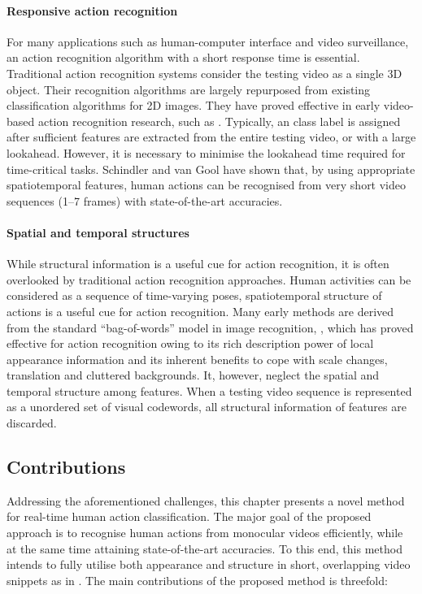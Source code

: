 \paragraph{Responsive action recognition}  
For many applications such as human-computer interface and video surveillance, an action recognition algorithm with a short response time is essential.  
Traditional action recognition systems consider the testing video as a single 3D object. 
Their recognition algorithms are largely repurposed from existing classification algorithms for 2D images. They have proved effective in early video-based action recognition research, such as \cite{Schuldt2004, Dollar2005}.  
Typically, an class label is assigned after sufficient features are extracted from the entire testing video, or with a large lookahead. However, it is necessary to minimise the lookahead time required for time-critical tasks. 
Schindler and van Gool \cite{Schindler2008} have shown that, by using appropriate spatiotemporal features, human actions can be recognised from very short video sequences (1--7 frames) with state-of-the-art accuracies.

\paragraph{Spatial and temporal structures}
While structural information is a useful cue for action recognition, it is often overlooked by traditional action recognition approaches. 
Human activities can be considered as a sequence of time-varying poses, spatiotemporal structure of actions is a useful cue for action recognition.  
Many early methods are derived from the standard ``bag-of-words'' model in image recognition, \eg \cite{Schuldt2004, Dollar2005, Laptev2008, Niebles2008}, which has proved effective for action recognition owing to its rich description power of local appearance information and its inherent benefits to cope with scale changes, translation and cluttered backgrounds. 
It, however, neglect the spatial and temporal structure among features. 
When a testing video sequence is represented as a unordered set of visual codewords, all structural information of features are discarded. 

\subsection{Contributions}

Addressing the aforementioned challenges, this chapter presents a novel method for real-time human action classification. The major goal of the proposed approach is to recognise human actions from monocular videos efficiently, while at the same time attaining state-of-the-art accuracies. To this end, this method intends to fully utilise both appearance and structure in short, overlapping video snippets as in \cite{Schindler2008}. The main contributions of the proposed method is threefold:  

